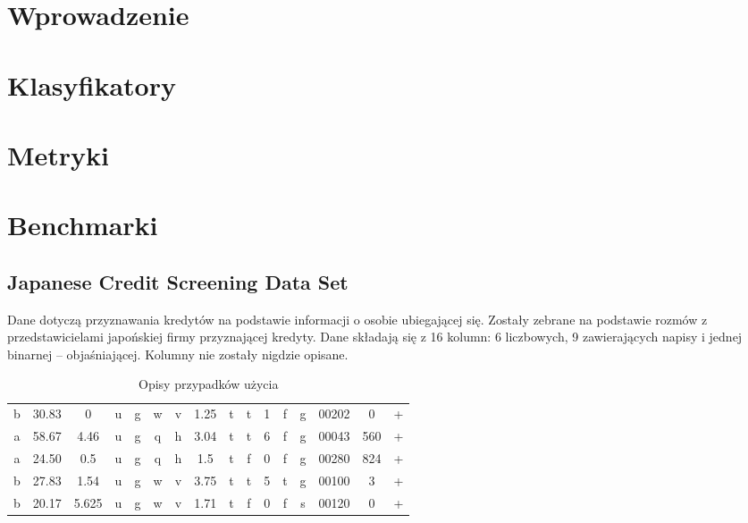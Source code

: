 \documentclass[pl]{minipw} %
\begin{document}
\sloppy


\tableofcontents


\cleardoublepage
\pagestyle{fancy}

\chapter*{Wprowadzenie}

\chapter{Klasyfikatory}

\chapter{Metryki}

\chapter{Benchmarki}
\section{Japanese Credit Screening Data Set}
Dane dotyczą przyznawania kredytów na podstawie informacji o osobie ubiegającej się. Zostały zebrane na podstawie rozmów z przedstawicielami japońskiej firmy przyznającej kredyty. Dane składają się z 16 kolumn: 6 liczbowych, 9 zawierających napisy i jednej binarnej -- objaśniającej. Kolumny nie zostały nigdzie opisane.

\begin{table}[H]
\caption{Opisy przypadków użycia}
\label{use_case_tab}
\centering
\begin{tabular}{|c|c|c|c|c|c|c|c|c|c|c|c|c|c|c|c|}
\hline

b  & 30.83  & 0  & u  & g  & w  & v  & 1.25  & t  & t  & 1  & f  & g  & 00202  & 0  & +\\
a  & 58.67  & 4.46  & u  & g  & q  & h  & 3.04  & t  & t  & 6  & f  & g  & 00043  & 560  & +\\
a  & 24.50  & 0.5  & u  & g  & q  & h  & 1.5  & t  & f  & 0  & f  & g  & 00280  & 824  & +\\
b  & 27.83  & 1.54  & u  & g  & w  & v  & 3.75  & t  & t  & 5  & t  & g  & 00100  & 3  & +\\
b  & 20.17  & 5.625  & u  & g  & w  & v  & 1.71  & t  & f  & 0  & f  & s  & 00120  & 0  & +\\
\hline
\end{tabular}
\end{table}
\end{document}
